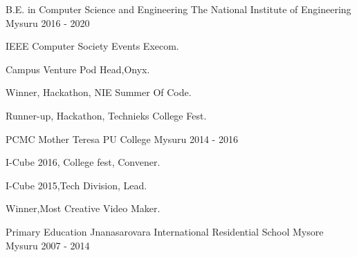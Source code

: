 

\begin{cventries}

  \cventry
    {B.E. in Computer Science and Engineering} %
    {The National Institute of Engineering} %
    {Mysuru} %
    {2016 - 2020} %
    {
      \begin{cvitems} %
        \item {IEEE Computer Society Events Execom.}
        \item {Campus Venture Pod Head,Onyx.}
         \item {Winner, Hackathon, NIE Summer Of Code.}
          \item {Runner-up, Hackathon, Technieks College Fest.}
      \end{cvitems}
    }

  \cventry
    {PCMC} %
    {Mother Teresa PU College} %
    {Mysuru} %
    {2014 - 2016} %
    {
      \begin{cvitems} %
        \item {I-Cube 2016, College fest, Convener.}
        \item {I-Cube 2015,Tech Division, Lead.}
         \item {Winner,Most Creative Video Maker.}
      \end{cvitems}
    }

  \cventry
    {Primary Education} %
    {Jnanasarovara International Residential School Mysore} %
    {Mysuru} %
    {2007 - 2014} %
    {
    }

\end{cventries}
